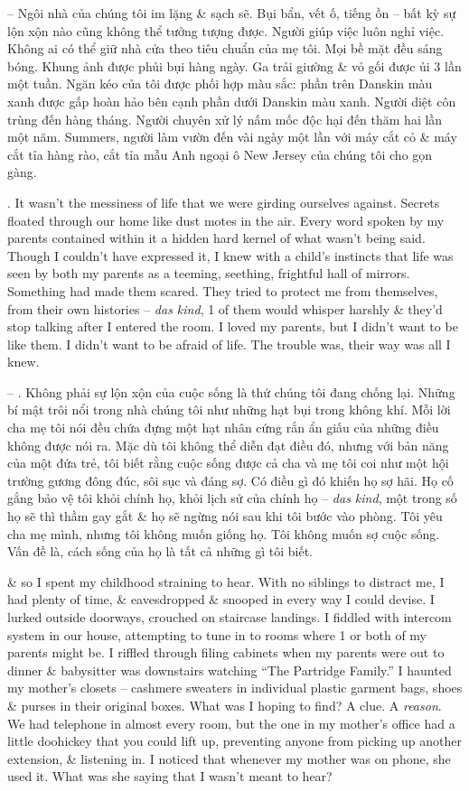 \documentclass{article}
\begin{document}
\begin{itemize}
	-- Ngôi nhà của chúng tôi im lặng \& sạch sẽ. Bụi bẩn, vết ố, tiếng ồn -- bất kỳ sự lộn xộn nào cũng không thể tưởng tượng được. Người giúp việc luôn nghỉ việc. Không ai có thể giữ nhà cửa theo tiêu chuẩn của mẹ tôi. Mọi bề mặt đều sáng bóng. Khung ảnh được phủi bụi hàng ngày. Ga trải giường \& vỏ gối được ủi 3 lần một tuần. Ngăn kéo của tôi được phối hợp màu sắc: phần trên Danskin màu xanh được gấp hoàn hảo bên cạnh phần dưới Danskin màu xanh. Người diệt côn trùng đến hàng tháng. Người chuyên xử lý nấm mốc độc hại đến thăm hai lần một năm. Summers, người làm vườn đến vài ngày một lần với máy cắt cỏ \& máy cắt tỉa hàng rào, cắt tỉa mẫu Anh ngoại ô New Jersey của chúng tôi cho gọn gàng.
	
	. It wasn't the messiness of life that we were girding ourselves against. Secrets floated through our home like dust motes in the air. Every word spoken by my parents contained within it a hidden hard kernel of what wasn't being said. Though I couldn't have expressed it, I knew with a child's instincts that life was seen by both my parents as a teeming, seething, frightful hall of mirrors. Something had made them scared. They tried to protect me from themselves, from their own histories -- {\it das kind}, 1 of them would whisper harshly \& they'd stop talking after I entered the room. I loved my parents, but I didn't want to be like them. I didn't want to be afraid of life. The trouble was, their way was all I knew.
	
	-- . Không phải sự lộn xộn của cuộc sống là thứ chúng tôi đang chống lại. Những bí mật trôi nổi trong nhà chúng tôi như những hạt bụi trong không khí. Mỗi lời cha mẹ tôi nói đều chứa đựng một hạt nhân cứng rắn ẩn giấu của những điều không được nói ra. Mặc dù tôi không thể diễn đạt điều đó, nhưng với bản năng của một đứa trẻ, tôi biết rằng cuộc sống được cả cha và mẹ tôi coi như một hội trường gương đông đúc, sôi sục và đáng sợ. Có điều gì đó khiến họ sợ hãi. Họ cố gắng bảo vệ tôi khỏi chính họ, khỏi lịch sử của chính họ -- {\it das kind}, một trong số họ sẽ thì thầm gay gắt \& họ sẽ ngừng nói sau khi tôi bước vào phòng. Tôi yêu cha mẹ mình, nhưng tôi không muốn giống họ. Tôi không muốn sợ cuộc sống. Vấn đề là, cách sống của họ là tất cả những gì tôi biết.
	
	\& so I spent my childhood straining to hear. With no siblings to distract me, I had plenty of time, \& eavesdropped \& snooped in every way I could devise. I lurked outside doorways, crouched on staircase landings. I fiddled with intercom system in our house, attempting to tune in to rooms where 1 or both of my parents might be. I riffled through filing cabinets when my parents were out to dinner \& babysitter was downstairs watching ``The Partridge Family.'' I haunted my mother's closets -- cashmere sweaters in individual plastic garment bags, shoes \& purses in their original boxes. What was I hoping to find? A clue. A {\it reason}. We had telephone in almost every room, but the one in my mother's office had a little doohickey that you could lift up, preventing anyone from picking up another extension, \& listening in. I noticed that whenever my mother was on phone, she used it. What was she saying that I wasn't meant to hear?
	

\end{itemize}
\end{document}
